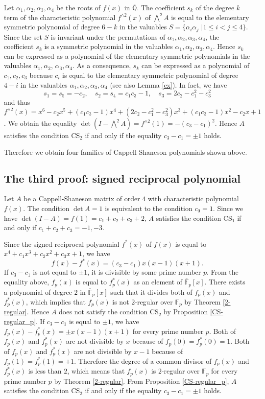\documentclass{amsart}
\theoremstyle{plain}
\theoremstyle{definition}
\theoremstyle{remark}
\begin{document}
Let $\alpha_1,\alpha_2,\alpha_3,\alpha_4$ be the roots of $f(x)$ in $\overline{\mathbb{Q}}$. 
The coefficient $s_k$ of the degree $k$ term of the characteristic polynomial 
$f^{\wedge 2}(x)$ of $\bigwedge^2A$ 
is equal to the elementary symmetric polynomial of degree $6-k$ in the valuables 
$S=\{\alpha_i\alpha_j\, |\, 1\leq i<j\leq 4\}$. Since the set $S$ is invariant under the permutations of 
$\alpha_1,\alpha_2,\alpha_3,\alpha_4$, the coefficient $s_k$ is a symmetric polynomial 
in the valuables $\alpha_1,\alpha_2,\alpha_3,\alpha_4$. 
Hence $s_k$ can be expressed as a polynomial of the elementary symmetric polynomials 
in the valuables $\alpha_1,\alpha_2$, $\alpha_3,\alpha_4$. 
As a consequence, $s_k$ can be expressed as a polynomial of $c_1,c_2,c_3$ 
because $c_i$ is equal to the elementary symmetric polynomial of degree $4-i$ in the valuables 
$\alpha_1,\alpha_2,\alpha_3,\alpha_4$ (see also Lemma \ref{ex}). In fact, we have 
\[
s_1=s_5=-c_2,\quad s_2=s_4=c_1c_3-1,\quad s_3=2c_2-c_1^2-c_3^2
\]
and thus $f^{\wedge 2}(x)=x^6-c_2x^5+(c_1c_3-1)x^4+(2c_2-c_1^2-c_3^2)x^3+(c_1c_3-1)x^2-c_2x+1$. 
We obtain the equality $\det(I-\bigwedge^2A)=f^{\wedge 2}(1)=-(c_3-c_1)^2$. 
Hence $A$ satisfies the condition $\mathrm{CS}_2$ if and only if the equality $c_3-c_1=\pm 1$ holds. 

Therefore we obtain four families of Cappell-Shaneson polynomials shown above. 

\subsection{The third proof: signed reciprocal polynomial}

Let $A$ be a Cappell-Shaneson matrix of order $4$ with characteristic polynomial $f(x)$. 
The condition $\det A=1$ is equivalent to the condition $c_0=1$. 
Since we have $\det(I-A)=f(1)=c_1+c_2+c_3+2$, 
$A$ satisfies the condition $\mathrm{CS}_1$ if and only if $c_1+c_2+c_3=-1,-3$. 

Since the signed reciprocal polynomial $f^*(x)$ of $f(x)$ is equal to $x^4+c_1x^3+c_2x^2+c_3x+1$, 
we have 
\[
f(x)-f^*(x)=(c_3-c_1)x(x-1)(x+1). 
\]
If $c_3-c_1$ is not equal to $\pm 1$, it is divisible by some prime number $p$. 
From the equality above, $f_p(x)$ is equal to $f_p^*(x)$ as an element of $\overline{\mathbb{F}}_p[x]$. 
There exists a polynomial of degree $2$ in $\overline{\mathbb{F}}_p[x]$ such that it divides both of $f_p(x)$ and 
$f_p^*(x)$, which implies that $f_p(x)$ is not $2$-regular over $\mathbb{F}_p$ by 
Theorem \ref{2-regular}. Hence $A$ does not satisfy the condition $\mathrm{CS}_2$ 
by Proposition \ref{CS-regular_p}. 
If $c_3-c_1$ is equal to $\pm 1$, we have $f_p(x)-f_p^*(x)=\pm x(x-1)(x+1)$ 
for every prime number $p$. 
Both of $f_p(x)$ and $f_p^*(x)$ are not divisible by $x$ because of $f_p(0)=f_p^*(0)=1$. 
Both of $f_p(x)$ and $f_p^*(x)$ are not divisible by $x-1$ because of $f_p(1)=f_p^*(1)=\pm 1$. 
Therefore the degree of a common divisor of $f_p(x)$ and $f_p^*(x)$ is less than $2$, 
which means that $f_p(x)$ is $2$-regular over $\mathbb{F}_p$ for every prime number $p$ 
by Theorem \ref{2-regular}. From Proposition \ref{CS-regular_p}, 
$A$ satisfies the condition $\mathrm{CS}_2$ if and only if the equality $c_3-c_1=\pm 1$ holds. 
\end{document}
